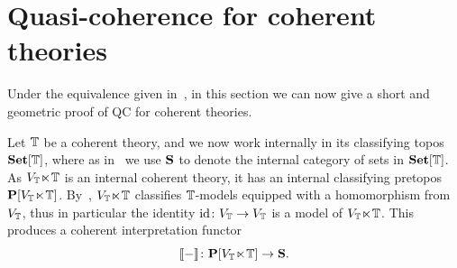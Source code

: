 \section{Quasi-coherence for coherent theories}\label{sec:qcforcoh}

Under the equivalence given in~, in this section we can now give a short and geometric proof of \gls{QC} for coherent theories. 

Let $\T$ be a coherent theory, and we now work internally in its classifying topos $\Set[\T]$, where as in~ we use $\mb S$ to denote the internal category of sets in $\Set[\T]$. As $\VT$ is an internal coherent theory, it has an internal classifying pretopos $\mb P[\VT]$. By~, $\VT$ classifies $\T$-models equipped with a homomorphism from $V_\T$, thus in particular the identity $\id \colon V_\T \to V_\T$ is a model of $\VT$. This produces a coherent interpretation functor 
\[ \ass- \colon \mb P[\VT] \to \mb S. \]


